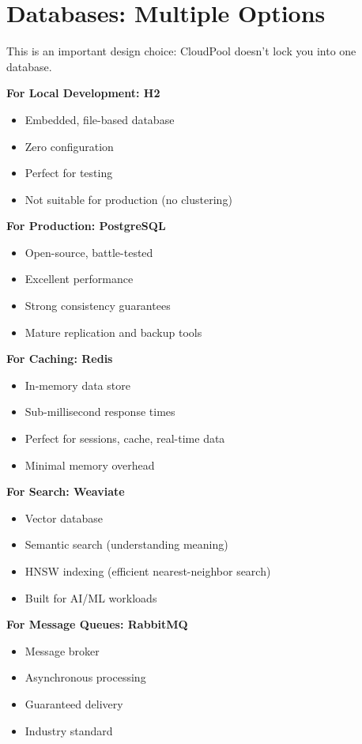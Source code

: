 \documentclass[11pt,a4paper]{report}
\begin{document}
\section{Databases: Multiple Options}


This is an important design choice: CloudPool doesn't lock you into one database.

\textbf{For Local Development: H2}
\begin{itemize}
\item Embedded, file-based database
\item Zero configuration
\item Perfect for testing
\item Not suitable for production (no clustering)

\end{itemize}
\textbf{For Production: PostgreSQL}
\begin{itemize}
\item Open-source, battle-tested
\item Excellent performance
\item Strong consistency guarantees
\item Mature replication and backup tools

\end{itemize}
\textbf{For Caching: Redis}
\begin{itemize}
\item In-memory data store
\item Sub-millisecond response times
\item Perfect for sessions, cache, real-time data
\item Minimal memory overhead

\end{itemize}
\textbf{For Search: Weaviate}
\begin{itemize}
\item Vector database
\item Semantic search (understanding meaning)
\item HNSW indexing (efficient nearest-neighbor search)
\item Built for AI/ML workloads

\end{itemize}
\textbf{For Message Queues: RabbitMQ}
\begin{itemize}
\item Message broker
\item Asynchronous processing
\item Guaranteed delivery
\item Industry standard

\end{itemize}
\end{document}
